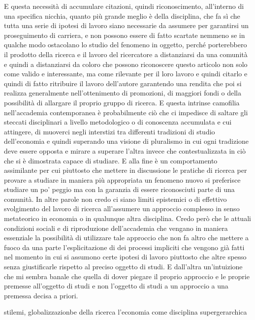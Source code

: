 \documentclass[a4paper, headings=standardclasses]{scrartcl}
\begin{document}
E questa necessità di accumulare citazioni, quindi riconoscimento, all'interno di una
specifica nicchia, quanto più grande meglio è della disciplina, che fa sì che tutta una serie
di ipotesi di lavoro siano necessarie da assumere per garantirsi un proseguimento di carriera,
e non possono essere di fatto scartate nemmeno se in qualche modo ostacolano lo studio del
fenomeno in oggetto, perché porterebbero il prodotto della ricerca e il lavoro del ricercatore
a distanziarsi da una comunità e quindi a distanziarsi da coloro che possono riconoscere
questo articolo non solo come valido e interessante, ma come rilevante per il loro lavoro e quindi
citarlo e quindi di fatto ritribuire il lavoro dell'autore garantendo una rendita che poi si
realizza generalmente nell'ottenimento di promozioni, di maggiori fondi o della possibilità
di allargare il proprio gruppo di ricerca. E questa intrinse camofilia nell'accademia contemporanea
è probabilmente ciò che ci impedisce di saltare gli steccati disciplinari a livello metodologico
o di conoscenza accumulata e cui attingere, di muoverci negli interstizi tra differenti tradizioni
di studio dell'economia e quindi superando una visione di pluralismo in cui ogni tradizione
deve essere opposta e mirare a superare l'altra invece che contestualizzata in ciò che si è
dimostrata capace di studiare. E alla fine è un comportamento assimilante per cui piuttosto
che mettere in discussione le pratiche di ricerca per provare a studiare in maniera più appropriata
un fenomeno nuovo si preferisce studiare un po' peggio ma con la garanzia di essere riconosciuti
parte di una comunità. In altre parole non credo ci siano limiti epistemici o di effettivo svolgimento
del lavoro di ricerca all'assumere un approccio complesso in senso metateorico in economia o in qualunque
altra disciplina. Credo però che le attuali condizioni sociali e di riproduzione dell'accademia
che vengano in maniera essenziale la possibilità di utilizzare tale approccio che non fa altro che
mettere a fuoco da una parte l'esplicitazione di dei processi impliciti che vengono già fatti
nel momento in cui si assumono certe ipotesi di lavoro piuttosto che altre spesso senza giustificarle
rispetto al preciso oggetto di studi. E dall'altra un'intuizione che mi sembra banale
che quella di dover piegare il proprio approccio e le proprie premesse all'oggetto di studi
e non l'oggetto di studi a un approccio a una premessa decisa a priori.

stilemi, globalizzazionbe della ricerca
l'economia come disciplina supergerarchica

\begin{refcontext}[sorting=nyt]
	\printbibliography
\end{refcontext}
\end{document}
